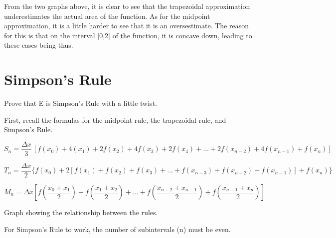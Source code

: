 \documentclass[letterpaper,12pt]{article}
\theoremstyle{definition}
\begin{document}
\vspace{1cm}

From the two graphs above, it is clear to see that the trapezoidal approximation underestimates the actual area of the function. As for the midpoint approximation, it is a little harder to see that it is an oversestimate. The reason for this is that on the interval [0,2] of the function, it is concave down, leading to these cases being thus.

\pagebreak

\section{Simpson's Rule}

\begin{large}
 Prove that E is Simpson's Rule with a little twist.
\end{large}

\vspace{1cm}

First, recall the formulas for the midpoint rule, the trapezoidal rule, and Simpson's Rule.

\vspace{1cm}

$S_n=\dfrac{\Delta x}{3}\, [f(x_0)+4(x_1)+2f(x_2)+4f(x_3)+2f(x_4)+\ldots+2f(x_{n-2})+4f(x_{n-1})+f(x_n)]$

\vspace{1cm}

$T_n=\dfrac{\Delta x}{2}\{ f(x_0)+2[f(x_1)+f(x_2)+f(x_3)+\ldots +f(x_{n-3})+f(x_{n-2})+f(x_{n-1})]+f(x_n)\}$

\vspace{1cm}

$M_n=\Delta x[f(\dfrac{x_0+x_1}{2})+f(\dfrac{x_1+x_2}{2})+\ldots +f(\dfrac{x_{n-2}+x_{n-1}}{2})+f(\dfrac{x_{n-1}+x_n}{2})]$

\vspace{1cm}

\begin{center}
\end{center}

\begin{center}
 Graph showing the relationship between the rules.
\end{center}

\vspace{1cm}

\pagebreak

For Simpson's Rule to work, the number of subintervals (n) must be even.
\end{document}
